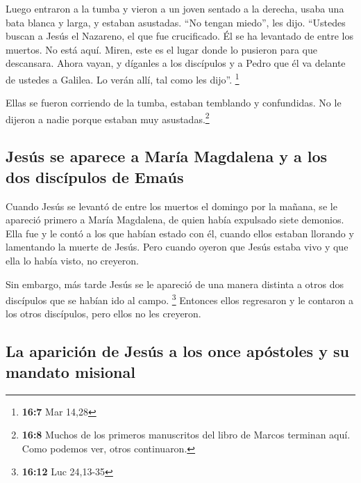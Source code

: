  Luego entraron a la tumba y vieron a un joven sentado a
la derecha, usaba una bata blanca y larga, y estaban asustadas.
 ``No tengan miedo'', les dijo. ``Ustedes buscan a Jesús
el Nazareno, el que fue crucificado. Él se ha levantado de entre los
muertos. No está aquí.  Miren, este es el lugar donde lo
pusieron para que descansara. Ahora vayan, y díganles a los discípulos y
a Pedro que él va delante de ustedes a Galilea. Lo verán allí, tal como
les dijo''. \footnote{\textbf{16:7} Mar 14,28}

 Ellas se fueron corriendo de la tumba, estaban temblando
y confundidas. No le dijeron a nadie porque estaban muy
asustadas.\footnote{\textbf{16:8} Muchos de los primeros manuscritos del
  libro de Marcos terminan aquí. Como podemos ver, otros continuaron.}

\hypertarget{jesuxfas-se-aparece-a-maruxeda-magdalena-y-a-los-dos-discuxedpulos-de-emauxfas}{%
\subsection{Jesús se aparece a María Magdalena y a los dos discípulos de
Emaús}\label{jesuxfas-se-aparece-a-maruxeda-magdalena-y-a-los-dos-discuxedpulos-de-emauxfas}}

 Cuando Jesús se levantó de entre los muertos el domingo
por la mañana, se le apareció primero a María Magdalena, de quien había
expulsado siete demonios.  Ella fue y le contó a los que
habían estado con él, cuando ellos estaban llorando y lamentando la
muerte de Jesús.  Pero cuando oyeron que Jesús estaba
vivo y que ella lo había visto, no creyeron.

 Sin embargo, más tarde Jesús se le apareció de una
manera distinta a otros dos discípulos que se habían ido al campo.
\footnote{\textbf{16:12} Luc 24,13-35}  Entonces ellos
regresaron y le contaron a los otros discípulos, pero ellos no les
creyeron.

\hypertarget{la-apariciuxf3n-de-jesuxfas-a-los-once-apuxf3stoles-y-su-mandato-misional}{%
\subsection{La aparición de Jesús a los once apóstoles y su mandato
misional}\label{la-apariciuxf3n-de-jesuxfas-a-los-once-apuxf3stoles-y-su-mandato-misional}}

